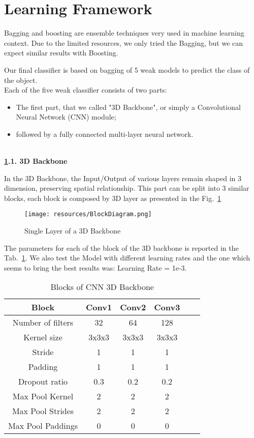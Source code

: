 
\section{Learning Framework}
\label{sec:learning_framework}
Bagging and boosting are ensemble techniques very used in machine learning context. Due to the limited resources, we only tried the Bagging, but we can expect similar results with Boosting. 

Our final classifier is based on bagging of 5 weak models to predict the class of the object.\\
Each of the five weak classifier consists of two parts:
\begin{itemize}
    \item The first part, that we called "3D Backbone", or simply a Convolutional Neural Network (CNN) module; %
    \item followed by a fully connected multi-layer neural network.
\end{itemize}
\ \\
\textbf{\ref{sec:learning_framework}.1. 3D Backbone}

In the 3D Backbone, the Input/Output of various layers remain shaped in 3 dimension, preserving spatial relationship. This part can be split into 3 similar blocks, each block is composed by 3D layer as presented in the Fig.~\ref{fig:blockDiagram}

\begin{figure}[h]
\begin{center}
        \centering
        \texttt{[image: resources/BlockDiagram.png]}
        \caption{Single Layer of a 3D Backbone}
        \label{fig:blockDiagram}
    \end{center}
\end{figure}

The parameters for each of the block of the 3D backbone is reported in the Tab.~\ref{tab:conv-layers}.
We also test the Model with different learning rates and the one which seems to bring the best results was: Learning Rate = 1e-3.


\begin{table}[h]
\centering
\caption{Blocks of CNN 3D Backbone}
\label{tab:conv-layers}
\begin{tabular}{cccccc}
    \hline
    Block & Conv1 & Conv2 & Conv3 \\
    \hline
    Number of filters & 32 & 64 & 128 \\
    Kernel size & 3x3x3 & 3x3x3 & 3x3x3 \\
    Stride & 1 & 1 & 1   \\
    Padding & 1 & 1 & 1  \\
    Dropout ratio & 0.3 & 0.2 & 0.2  \\
    Max Pool Kernel & 2 & 2 & 2\\
    Max Pool Strides & 2 & 2 & 2\\
    Max Pool Paddings & 0 & 0 & 0\\
    \hline
\end{tabular}
\end{table}

